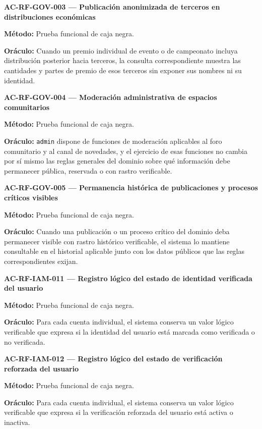 \documentclass[10pt,letterpaper]{article}
\begin{document}
\noindent\textbf{AC-RF-GOV-003 --- Publicación anonimizada de terceros en distribuciones económicas}\par
\textbf{Método:} Prueba funcional de caja negra.\par
\textbf{Oráculo:} Cuando un premio individual de evento o de campeonato incluya distribución posterior hacia terceros, la consulta correspondiente muestra las cantidades y partes de premio de esos terceros sin exponer sus nombres ni su identidad.\par\vspace{0.45em}
\noindent\textbf{AC-RF-GOV-004 --- Moderación administrativa de espacios comunitarios}\par
\textbf{Método:} Prueba funcional de caja negra.\par
\textbf{Oráculo:} \texttt{admin} dispone de funciones de moderación aplicables al foro comunitario y al canal de novedades, y el ejercicio de esas funciones no cambia por sí mismo las reglas generales del dominio sobre qué información debe permanecer pública, reservada o con rastro verificable.\par\vspace{0.45em}
\noindent\textbf{AC-RF-GOV-005 --- Permanencia histórica de publicaciones y procesos críticos visibles}\par
\textbf{Método:} Prueba funcional de caja negra.\par
\textbf{Oráculo:} Cuando una publicación o un proceso crítico del dominio deba permanecer visible con rastro histórico verificable, el sistema lo mantiene consultable en el historial aplicable junto con los datos públicos que las reglas correspondientes exijan.\par\vspace{0.45em}
\noindent\textbf{AC-RF-IAM-011 --- Registro lógico del estado de identidad verificada del usuario}\par
\textbf{Método:} Prueba funcional de caja negra.\par
\textbf{Oráculo:} Para cada cuenta individual, el sistema conserva un valor lógico verificable que expresa si la identidad del usuario está marcada como verificada o no verificada.\par\vspace{0.45em}
\noindent\textbf{AC-RF-IAM-012 --- Registro lógico del estado de verificación reforzada del usuario}\par
\textbf{Método:} Prueba funcional de caja negra.\par
\textbf{Oráculo:} Para cada cuenta individual, el sistema conserva un valor lógico verificable que expresa si la verificación reforzada del usuario está activa o inactiva.\par\vspace{0.45em}
\end{document}
